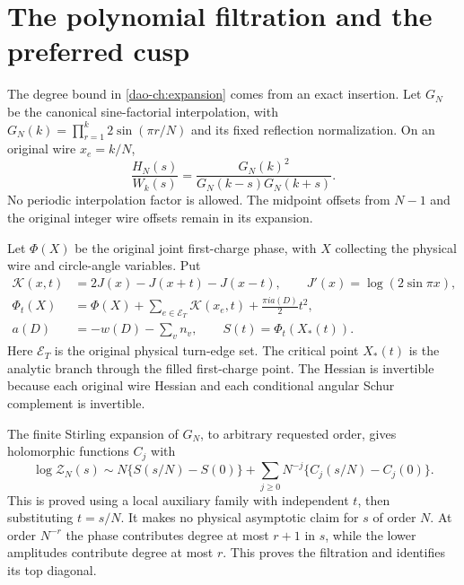\section{The polynomial filtration and the preferred cusp}
\label{dao-ch:filtration}

The degree bound in \eqref{dao-ch:expansion} comes from an exact
insertion. Let $G_N$ be the canonical sine-factorial interpolation,
with $G_N(k)=\prod_{r=1}^{k}2\sin(\pi r/N)$ and its fixed reflection
normalization. On an original wire $x_e=k/N$,
\begin{equation}\label{dao-ch:insertion}
 \frac{H_N(s)}{W_k(s)}
  =\frac{G_N(k)^2}{G_N(k-s)G_N(k+s)}.
\end{equation}
No periodic interpolation factor is allowed. The midpoint offsets
from $N-1$ and the original integer wire offsets remain in its
expansion.

Let $\Phi(X)$ be the original joint first-charge phase, with $X$
collecting the physical wire and circle-angle variables. Put
\begin{equation}\label{dao-ch:phase}
\begin{aligned}
 \mathcal K(x,t)&=2J(x)-J(x+t)-J(x-t),\qquad
 J'(x)=\log(2\sin\pi x),\\
 \Phi_t(X)&=\Phi(X)+\sum_{e\in\mathcal E_T}\mathcal K(x_e,t)
                   +\frac{\pi i a(D)}2t^2,\\
 a(D)&=-w(D)-\sum_vn_v,\qquad S(t)=\Phi_t(X_*(t)).
\end{aligned}
\end{equation}
Here $\mathcal E_T$ is the original physical turn-edge set. The
critical point $X_*(t)$ is the analytic branch through the filled
first-charge point. The Hessian is invertible because each original
wire Hessian and each conditional angular Schur complement is
invertible.

The finite Stirling expansion of $G_N$, to arbitrary requested
order, gives holomorphic functions $C_j$ with
\begin{equation}\label{dao-ch:organized}
 \log\mathcal Z_N(s)\sim
 N\{S(s/N)-S(0)\}
   +\sum_{j\ge0}N^{-j}\{C_j(s/N)-C_j(0)\}.
\end{equation}
This is proved using a local auxiliary family with independent
$t$, then substituting $t=s/N$. It makes no physical asymptotic
claim for $s$ of order $N$. At order $N^{-r}$ the phase contributes
degree at most $r+1$ in $s$, while the lower amplitudes contribute
degree at most $r$. This proves the filtration and identifies its
top diagonal.

